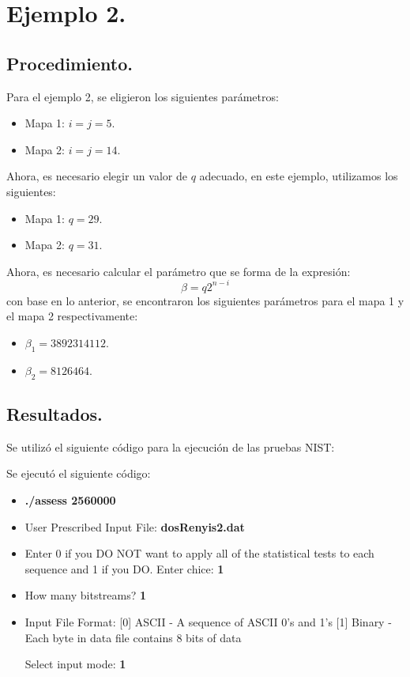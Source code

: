 \documentclass[12pt,3p]{elsarticle}
\begin{document}
\section{Ejemplo 2.}

\subsection{Procedimiento.}
Para el ejemplo 2, se eligieron los siguientes parámetros:

\begin{itemize}
\item Mapa 1: $i = j = 5$.


\item Mapa 2: $i = j = 14$.
\end{itemize}

Ahora, es necesario elegir un valor de $q$ adecuado, en este ejemplo, utilizamos los siguientes:

\begin{itemize}
\item Mapa 1: $q = 29.$
\item Mapa 2: $q = 31.$
\end{itemize}


Ahora, es necesario calcular el parámetro que se forma de la expresión:  
\begin{equation}
\beta = q 2^{n-i}
\end{equation}
con base en lo anterior, se encontraron los siguientes parámetros para el mapa 1 y el mapa 2 respectivamente:

\begin{itemize}
\item $\beta_{1}=3892314112$.
\item $\beta_{2}=8126464$.
\end{itemize}


\subsection{Resultados.}

Se utilizó el siguiente código para la ejecución de las pruebas NIST:

Se ejecutó el siguiente código:

\begin{itemize}
\item \textbf{./assess 2560000}
\item User Prescribed Input File: \textbf{dosRenyis2.dat}
\item    Enter 0 if you DO NOT want to apply all of the
         statistical tests to each sequence and 1 if you DO. Enter chice: \textbf{1}
                  
\item  How many bitstreams? \textbf{1}

\item Input File Format:
    [0] ASCII - A sequence of ASCII 0's and 1's
    [1] Binary - Each byte in data file contains 8 bits of data

   Select input mode:  \textbf{1}
\end{itemize}
\end{document}
